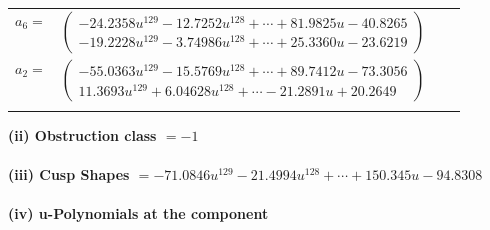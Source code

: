 \documentclass[1p]{elsarticle_modified}
\theoremstyle{definition}
\begin{document}
\begin{tabular}{m{7pt} m{180pt} m{7pt} m{180pt} }
\flushright $a_{6}=$&$\begin{pmatrix}-24.2358 u^{129}-12.7252 u^{128}+\cdots+81.9825 u-40.8265\\-19.2228 u^{129}-3.74986 u^{128}+\cdots+25.3360 u-23.6219\end{pmatrix}$ \\
\flushright $a_{2}=$&$\begin{pmatrix}-55.0363 u^{129}-15.5769 u^{128}+\cdots+89.7412 u-73.3056\\11.3693 u^{129}+6.04628 u^{128}+\cdots-21.2891 u+20.2649\end{pmatrix}$\\&\end{tabular}
\flushleft \textbf{(ii) Obstruction class $= -1$}\\~\\
\flushleft \textbf{(iii) Cusp Shapes $= -71.0846 u^{129}-21.4994 u^{128}+\cdots+150.345 u-94.8308$}\\~\\
\newpage\renewcommand{\arraystretch}{1}
\flushleft \textbf{(iv) u-Polynomials at the component}\newline \\
\end{document}
